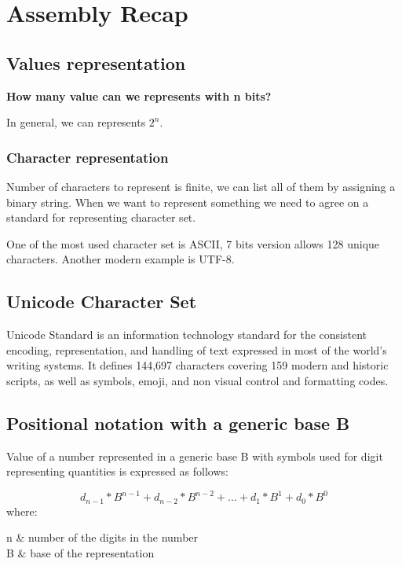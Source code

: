 \section{Assembly Recap}

\subsection{Values representation}

\textbf{How many value can we represents with n bits?}

In general, we can represents \textbf{$2^n$}.

\subsubsection{Character representation}

Number of characters to represent is finite, we can list all of them by assigning a binary string. 
When we want to represent something we need to agree on a standard for representing character set.
\par 
One of the most used character set is ASCII, 7 bits version allows 128 unique characters. 
Another modern example is UTF-8. 

\subsection{Unicode Character Set}

Unicode Standard is an information technology standard for the consistent encoding, representation, and handling of text expressed in most of the
world's writing systems. It defines 144,697 characters covering 159 modern and historic scripts, as well as symbols, emoji, and non visual control and formatting codes.

\subsection{Positional notation with a generic base B}

Value of a number represented in a generic base B with symbols used for digit representing quantities is expressed as follows: 

\begin{equation}
\label{conversion_formula}
    d_{n-1} * B^{n-1} + d_{n-2} * B^{n-2} + ... + d_{1} * B^{1} + d_{0} * B^{0}
\end{equation}
where: 
\begin{conditions}
 n     &  number of the digits in the number \\
 B     &  base of the representation
\end{conditions}

